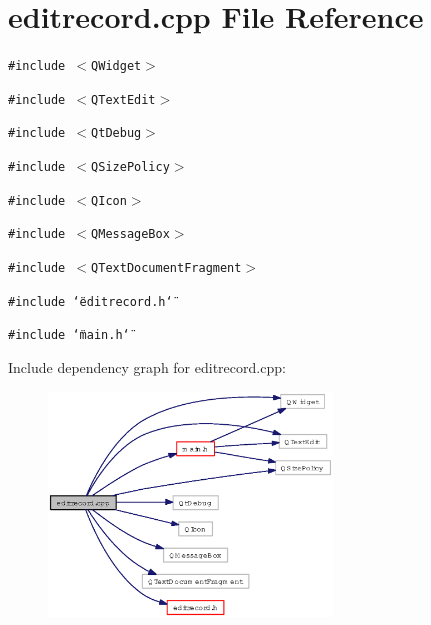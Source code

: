 \section{editrecord.cpp File Reference}
\label{editrecord_8cpp}
{\tt \#include $<$QWidget$>$}\par
{\tt \#include $<$QText\-Edit$>$}\par
{\tt \#include $<$Qt\-Debug$>$}\par
{\tt \#include $<$QSize\-Policy$>$}\par
{\tt \#include $<$QIcon$>$}\par
{\tt \#include $<$QMessage\-Box$>$}\par
{\tt \#include $<$QText\-Document\-Fragment$>$}\par
{\tt \#include \char`\"{}editrecord.h\char`\"{}}\par
{\tt \#include \char`\"{}main.h\char`\"{}}\par


Include dependency graph for editrecord.cpp:\begin{figure}[H]
\begin{center}
\leavevmode
\includegraphics[width=214pt]{editrecord_8cpp__incl}
\end{center}
\end{figure}
